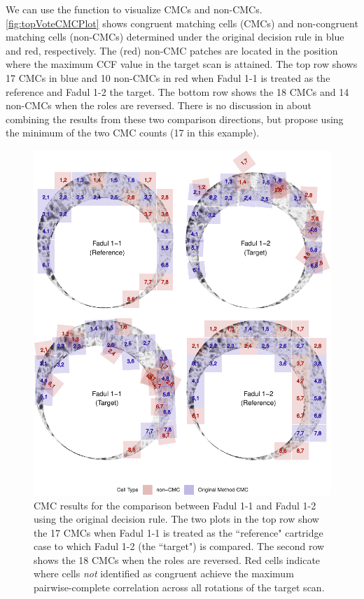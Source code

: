 We can use the  function to visualize CMCs and non-CMCs.
\autoref{fig:topVoteCMCPlot} shows congruent matching cells (CMCs) and
non-congruent matching cells (non-CMCs) determined under the original
decision rule in blue and red, respectively. The (red) non-CMC patches
are located in the position where the maximum CCF value in the target
scan is attained. The top row shows 17 CMCs in blue and 10 non-CMCs in
red when Fadul 1-1 is treated as the reference and Fadul 1-2 the target.
The bottom row shows the 18 CMCs and 14 non-CMCs when the roles are
reversed. There is no discussion in \citet{song_proposed_2013} about
combining the results from these two comparison directions, but
\citet{tong_improved_2015} propose using the minimum of the two CMC
counts (17 in this example).

\begin{Schunk}
\begin{figure}[htbp]

{\centering \includegraphics[width=\textwidth]{figures/kmOriginalMethod} 

}

\caption{\label{fig:topVoteCMCPlot} CMC results for the comparison between Fadul 1-1 and Fadul 1-2 using the original decision rule. The two plots in the top row show the 17 CMCs when Fadul 1-1 is treated as the ``reference" cartridge case to which Fadul 1-2 (the ``target") is compared. The second row shows the 18 CMCs when the roles are reversed. Red cells indicate where cells \emph{not} identified as congruent achieve the maximum pairwise-complete correlation across all rotations of the target scan. }\label{fig:unnamed-chunk-16}
\end{figure}
\end{Schunk}

